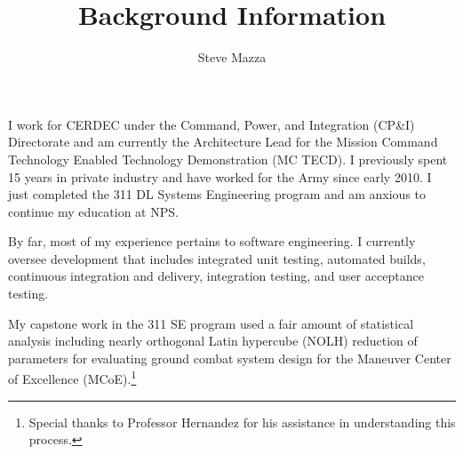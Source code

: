 \documentclass[letterpaper,10pt]{article}
\title{Background Information}
\author{Steve Mazza}
\begin{document}
\maketitle

I work for CERDEC under the Command, Power, and Integration (CP\&I) Directorate and am currently the Architecture Lead for the Mission Command Technology Enabled Technology Demonstration (MC TECD).  I previously spent 15 years in private industry and have worked for the Army since early 2010.  I just completed the 311 DL Systems Engineering program and am anxious to continue my education at NPS.

By far, most of my experience pertains to software engineering.  I currently oversee development that includes integrated unit testing, automated builds, continuous integration and delivery, integration testing, and user acceptance testing.

My capstone work in the 311 SE program used a fair amount of statistical analysis including nearly orthogonal Latin hypercube (NOLH) reduction of parameters for evaluating ground combat system design for the Maneuver Center of Excellence (MCoE).\footnote{Special thanks to Professor Hernandez for his assistance in understanding this process.}
\end{document}
